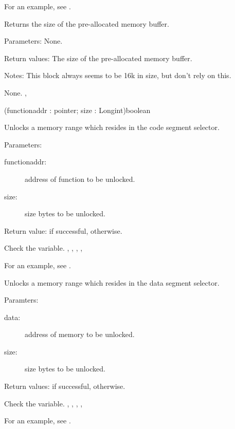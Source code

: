 For an example, see 
.

{Returns the size of the pre-allocated \dos memory buffer.

Parameters: None.

Return values: The size of the pre-allocated \dos memory buffer.

Notes:
This block always seems to be 16k in size, but don't rely on this.
}
{None.}
{, 
}



{(functionaddr : pointer; size : Longint)}{boolean}
{Unlocks a memory range which resides in the code segment selector.

Parameters:
\begin{description}
\item[functionaddr:\ ] address of function to be unlocked. 
\item[size:\ ] size bytes to be unlocked.
\end{description}

Return value:  if successful,  otherwise.
}{ Check the  variable.}
{,
 ,
,
,
 }

For an example, see .


{Unlocks a memory range which resides in the data segment selector.

Paramters:
\begin{description}
\item[data:\ ] address of memory to be unlocked. 
\item[size:\ ] size bytes to be unlocked.
\end{description}

Return values:  if successful,  otherwise.
}
{ Check the  variable.}
{,
,
,
,
 }

For an example, see .

